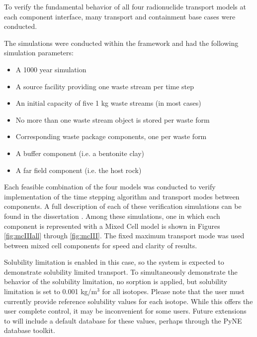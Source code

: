 
To verify the fundamental behavior of all four \Cyder radionuclide transport models at
each component interface, many transport and containment base cases were
conducted.

The simulations were conducted within the \Cyclus framework and had the
following simulation parameters:

\begin{itemize}
\item{A 1000 year simulation}
\item{A source facility providing one waste stream per time step}
\item{An initial capacity of five 1 kg waste streams (in most cases)}
\item{No more than one waste stream object is stored per waste form}
\item{Corresponding waste package components, one per waste form}
\item{A buffer component (i.e. a bentonite clay)}
\item{A far field component (i.e. the host rock)}
\end{itemize}


Each feasible combination of the four models was conducted to verify
implementation of the time stepping algorithm and transport modes between
components. A full description of each of these verification simulations can be 
found in the dissertation \cite{huff_integrated_2013}. Among these simulations, 
one in which each component is represented with a Mixed Cell model is shown 
in Figures 
\ref{fig:mcIIIall} through \ref{fig:mcIII}.  
The fixed maximum transport mode was used between mixed cell components for speed and clarity of results.

Solubility limitation is enabled 
in this case, so the system is expected to demonstrate solubility limited 
transport.  To simultaneously demonstrate the behavior of the solubility 
limitation, no sorption is applied, but solubility limitation is set to 0.001 
kg/m$^3$ for all isotopes.  Please note that the \Cyder user must currently 
provide reference solubility values for each isotope. While this offers the 
user complete control, it may be inconvenient for some users. Future extensions 
to \Cyder will include a default database for these values, perhaps through the 
\gls{PyNE} database toolkit\cite{bates_pyne_2014}. 



\FloatBarrier

